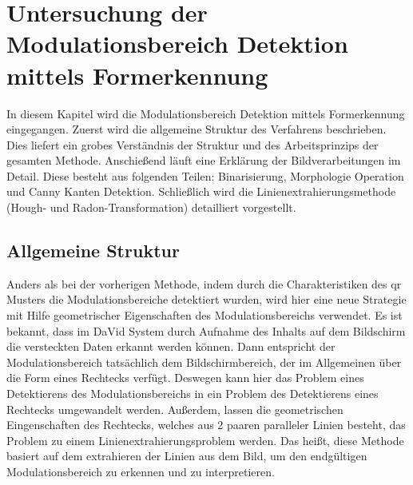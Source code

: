 \chapter{Untersuchung der Modulationsbereich Detektion mittels Formerkennung} 

In diesem Kapitel wird die Modulationsbereich Detektion mittels Formerkennung eingegangen. Zuerst wird die allgemeine Struktur des Verfahrens beschrieben. Dies liefert ein grobes Verständnis der Struktur und des Arbeitsprinzips der gesamten Methode. Anschießend läuft eine Erklärung der Bildverarbeitungen im Detail. Diese besteht aus folgenden Teilen: Binarisierung, Morphologie Operation und Canny Kanten Detektion. Schließlich wird die Linienextrahierungsmethode (Hough- und Radon-Transformation) detailliert vorgestellt. 

\section{Allgemeine Struktur} 

Anders als bei der vorherigen Methode, indem durch die Charakteristiken des \gls{qr} Musters die Modulationsbereiche detektiert wurden, wird hier eine neue Strategie mit Hilfe geometrischer Eigenschaften des Modulationsbereichs verwendet. Es ist bekannt, dass im DaVid System durch Aufnahme des Inhalts auf dem Bildschirm die versteckten Daten erkannt werden können. Dann entspricht der Modulationsbereich tatsächlich dem Bildschirmbereich, der im Allgemeinen über die Form eines Rechtecks verfügt. Deswegen kann hier das Problem eines Detektierens des Modulationsbereichs in ein Problem des Detektierens eines Rechtecks umgewandelt werden. Außerdem, lassen die geometrischen Eingenschaften des Rechtecks, welches aus 2 paaren paralleler Linien besteht, das Problem zu einem Linienextrahierungsproblem werden. Das heißt, diese Methode basiert auf dem extrahieren der Linien aus dem Bild, um den endgültigen Modulationsbereich zu erkennen und zu interpretieren. %


